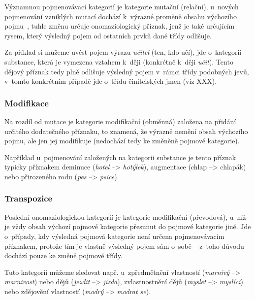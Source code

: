 Významnou pojmenovávací kategorií je kategorie mutační (relační),
u~nových pojmenování vzniklých mutací dochází k~výrazné proměně obsahu
výchozího pojmu~\parencite[102]{dokulil00}, tuhle změnu určuje
onomaziologický příznak, jenž je také určujícím rysem, který výsledný
pojem od ostatních prvků dané třídy odlišuje.~\parencite{enc-mutace17}

Za příklad si můžeme uvést pojem výrazu \emph{učitel} (ten, kdo učí),
jde o~kategorii substance, která je vymezena vztahem k~ději (konkrétně
k~ději \emph{učit}). Tento dějový příznak tedy plně odlišuje výsledný
pojem v~rámci třídy podobných jevů, v~tomto konkrétním případě jde
o~třídu činitelských jmen (viz XXX).

\hypertarget{modifikace}{%
\subsubsection{Modifikace}\label{modifikace}}

Na rozdíl od mutace je kategorie modifikační (obměnná) založena na
přidání určitého dodatečného příznaku, to znamená, že výrazně nemění
obsah výchozího pojmu, ale jen jej modifikuje (nedochází tedy ke změněně
pojmové kategorie).~\parencite[102]{dokulil00}

Například u~pojmenování založených na kategorii substance je tento
příznak typicky příznakem deminuce (\emph{hotel} --\textgreater{}
\emph{hotýlek}), augmentace (chlap --\textgreater{} chlapák) nebo
přirozeného rodu (\emph{pes} --\textgreater{} \emph{psice}).

\hypertarget{transpozice}{%
\subsubsection{Transpozice}\label{transpozice}}

Poslední onomaziologickou kategorií je kategorie modifikační
(převodová), u~níž je vždy obsah výchozí pojmové kategorie přesunut do
pojmové kategorie jiné. Jde o~případy, kdy výsledná pojmová kategorie
není určena pojmenovávacím příznakem, protože tím je vlastně výsledný
pojem sám o~sobě -- z~toho důvodu dochází pouze ke změně pojmové třídy.
\parencite[103]{dokulil00}

Tuto kategorii můžeme sledovat např. u~zpředmětnění vlastností
(\emph{marnivý} --\textgreater{} \emph{marnivost}) nebo dějů
(\emph{jezdit} --\textgreater{} \emph{jízda}), zvlastnostnění dějů
(\emph{myslet} --\textgreater{} \emph{myslící}) nebo zdějovění
vlastností (\emph{modrý} --\textgreater{} \emph{modrat se}).

